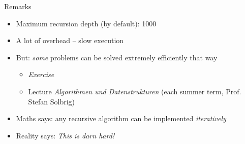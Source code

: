 
\begin{frame}[fragile]
%
	\begin{codebox}
		\begin{codebox}
			\begin{codebox}
				\begin{codebox}
				\scriptsize{}
				\end{codebox}
				\scriptsize{}
			\end{codebox}
			\scriptsize{}
		\end{codebox}
		\scriptsize{}
	\end{codebox}
%
\end{frame}



\begin{frame}{Remarks}
%
\begin{itemize}
\item Maximum recursion depth (by default): 1000
\item A lot of overhead -- slow execution
\item But: \emph{some} problems can be solved extremely efficiently that way
	\begin{itemize}
	\item [\thus] \emph{Exercise}
	\item [\thus] Lecture \emph{Algorithmen und Datenstrukturen} (each summer term, Prof. Stefan Solbrig)
	\end{itemize}
\item Maths says: any recursive algorithm can be implemented \emph{iteratively}
\item Reality says: \emph{This is darn hard!}
\end{itemize}
%
\end{frame}